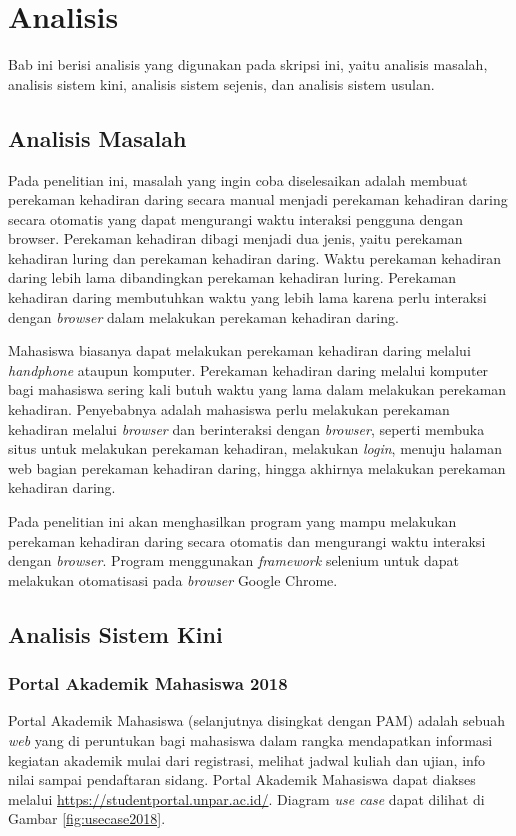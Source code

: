 \chapter{Analisis}
\label{chap:analisis}
Bab ini berisi analisis yang digunakan pada skripsi ini, yaitu analisis masalah, analisis sistem kini, analisis sistem sejenis, dan analisis sistem usulan.

\section{Analisis Masalah}
\label{sec:masalah}
Pada penelitian ini, masalah yang ingin coba diselesaikan adalah membuat perekaman kehadiran daring secara manual menjadi perekaman kehadiran daring secara otomatis yang dapat mengurangi waktu interaksi pengguna dengan browser. Perekaman kehadiran dibagi menjadi dua jenis, yaitu perekaman kehadiran luring dan perekaman kehadiran daring. Waktu perekaman kehadiran daring lebih lama dibandingkan perekaman kehadiran luring. Perekaman kehadiran daring membutuhkan waktu yang lebih lama karena perlu interaksi dengan \textit{browser} dalam melakukan perekaman kehadiran daring. 

Mahasiswa biasanya dapat melakukan perekaman kehadiran daring melalui \textit{handphone} ataupun komputer. Perekaman kehadiran daring melalui komputer bagi mahasiswa sering kali butuh waktu yang lama dalam melakukan perekaman kehadiran. Penyebabnya adalah mahasiswa perlu melakukan perekaman kehadiran melalui \textit{browser} dan berinteraksi dengan \textit{browser}, seperti membuka situs untuk melakukan perekaman kehadiran, melakukan \textit{login}, menuju halaman web bagian perekaman kehadiran daring, hingga akhirnya melakukan perekaman kehadiran daring. 

Pada penelitian ini akan menghasilkan program yang mampu melakukan perekaman kehadiran daring secara otomatis dan mengurangi waktu interaksi dengan \textit{browser}. Program menggunakan \textit{framework} selenium untuk dapat melakukan otomatisasi pada \textit{browser} Google Chrome.


\section{Analisis Sistem Kini}

\subsection{Portal Akademik Mahasiswa 2018}
\label{sec:pam} 
Portal Akademik Mahasiswa (selanjutnya disingkat dengan PAM) adalah sebuah \textit{web} yang di peruntukan bagi mahasiswa dalam rangka mendapatkan informasi kegiatan akademik mulai dari registrasi, melihat jadwal kuliah dan ujian, info nilai sampai pendaftaran sidang\cite{portalunpar}. Portal Akademik Mahasiswa dapat diakses melalui \url{https://studentportal.unpar.ac.id/}. Diagram \textit{use case} dapat dilihat di Gambar \ref{fig:usecase2018}.

